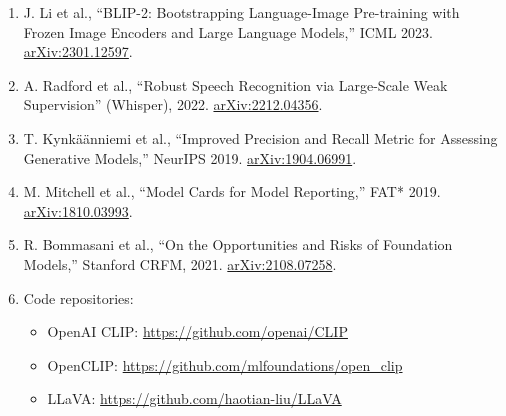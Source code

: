\documentclass[11pt]{article}
\theoremstyle{remark}
\begin{document}
\begin{enumerate}[leftmargin=1.8em, itemsep=2pt]
  \item J. Li et al., ``BLIP-2: Bootstrapping Language-Image Pre-training with Frozen Image Encoders and Large Language Models,'' ICML 2023. \href{https://arxiv.org/abs/2301.12597}{arXiv:2301.12597}.
  \item A. Radford et al., ``Robust Speech Recognition via Large-Scale Weak Supervision'' (Whisper), 2022. \href{https://arxiv.org/abs/2212.04356}{arXiv:2212.04356}.
  \item T. Kynk\"a\"anniemi et al., ``Improved Precision and Recall Metric for Assessing Generative Models,'' NeurIPS 2019. \href{https://arxiv.org/abs/1904.06991}{arXiv:1904.06991}.
  \item M. Mitchell et al., ``Model Cards for Model Reporting,'' FAT* 2019. \href{https://arxiv.org/abs/1810.03993}{arXiv:1810.03993}.
  \item R. Bommasani et al., ``On the Opportunities and Risks of Foundation Models,'' Stanford CRFM, 2021. \href{https://arxiv.org/abs/2108.07258}{arXiv:2108.07258}.
  \item Code repositories:
  \begin{itemize}[leftmargin=1.2em, itemsep=1pt]
    \item OpenAI CLIP: \url{https://github.com/openai/CLIP}
    \item OpenCLIP: \url{https://github.com/mlfoundations/open_clip}
    \item LLaVA: \url{https://github.com/haotian-liu/LLaVA}
  \end{itemize}
\end{enumerate}
\end{document}
